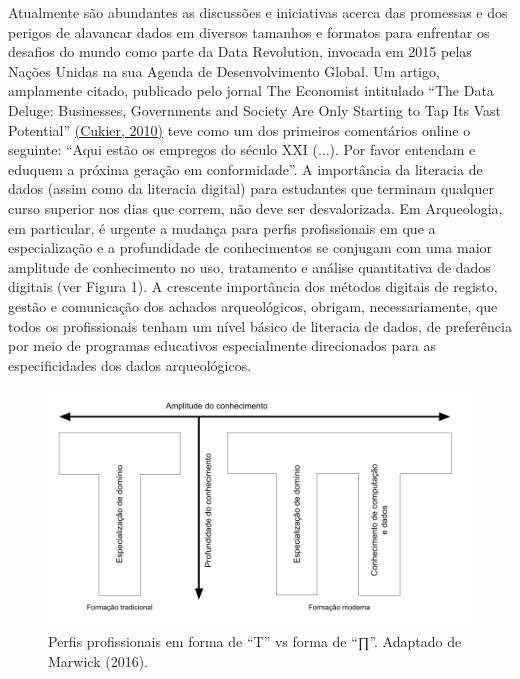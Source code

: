 \documentclass[
  letterpaper,
  DIV=11,
  numbers=noendperiod]{scrreprt}
\begin{document}
Atualmente são abundantes as discussões e iniciativas acerca das
promessas e dos perigos de alavancar dados em diversos tamanhos e
formatos para enfrentar os desafios do mundo como parte da Data
Revolution, invocada em 2015 pelas Nações Unidas na sua Agenda de
Desenvolvimento Global. Um artigo, amplamente citado, publicado pelo
jornal The Economist intitulado ``The Data Deluge: Businesses,
Governments and Society Are Only Starting to Tap Its Vast Potential''
\href{https://www.zotero.org/google-docs/?0alIdL}{(Cukier, 2010)} teve
como um dos primeiros comentários online o seguinte: ``Aqui estão os
empregos do século XXI (...). Por favor entendam e eduquem a próxima
geração em conformidade''. A importância da literacia de dados (assim
como da literacia digital) para estudantes que terminam qualquer curso
superior nos dias que correm, não deve ser desvalorizada. Em
Arqueologia, em particular, é urgente a mudança para perfis
profissionais em que a especialização e a profundidade de conhecimentos
se conjugam com uma maior amplitude de conhecimento no uso, tratamento e
análise quantitativa de dados digitais (ver Figura 1). A crescente
importância dos métodos digitais de registo, gestão e comunicação dos
achados arqueológicos, obrigam, necessariamente, que todos os
profissionais tenham um nível básico de literacia de dados, de
preferência por meio de programas educativos especialmente direcionados
para as especificidades dos dados arqueológicos.

\begin{figure}[H]

{\centering \includegraphics[width=20cm,height=\textheight]{images/pishaped.png}

}

\caption{Perfis profissionais em forma de ``T'' vs forma de ``∏''.
Adaptado de Marwick (2016).}

\end{figure}%
\end{document}

